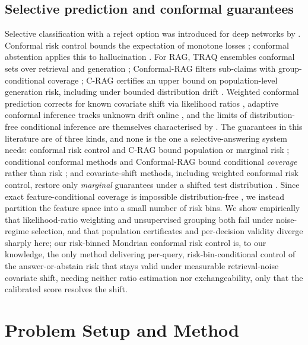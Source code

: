 \documentclass[sn-basic]{sn-jnl}
\theoremstyle{thmstyleone}
\theoremstyle{thmstyletwo}
\begin{document}
\subsection{Selective prediction and conformal guarantees}
Selective classification with a reject option was introduced for deep networks by \citet{geifman2017selective}. Conformal risk control bounds the
expectation of monotone losses \citep{angelopoulos2024crc}; conformal abstention applies this to hallucination \citep{abbasi2024conformalabstention}. For RAG, TRAQ ensembles
conformal sets over retrieval and generation \citep{li2024traq};
Conformal-RAG filters sub-claims with group-conditional coverage
\citep{feng2025conformalrag}; C-RAG certifies an upper bound on
population-level generation risk, including under bounded distribution
drift \citep{kang2024crag}. Weighted conformal prediction corrects for
known covariate shift via likelihood ratios
\citep{tibshirani2019covariate}, adaptive conformal inference tracks
unknown drift online \citep{gibbs2021aci}, and the limits of
distribution-free conditional inference are themselves characterised by
\citet{barber2021limits}.
The guarantees in this literature are of three kinds, and none is the one a
selective-answering system needs: conformal risk control and C-RAG bound
population or marginal risk \citep{angelopoulos2024crc,kang2024crag}; conditional
conformal methods and Conformal-RAG bound conditional \emph{coverage} rather than
risk \citep{gibbs2025conditional,feng2025conformalrag}; and covariate-shift
methods, including weighted conformal risk control, restore only \emph{marginal}
guarantees under a shifted test distribution
\citep{tibshirani2019covariate,gibbs2021aci,zecchin2025wcrc}. Since exact
feature-conditional coverage is impossible distribution-free
\citep{barber2021limits}, we instead partition the feature space into a small
number of risk bins. We show empirically that likelihood-ratio weighting and
unsupervised grouping both fail under noise-regime selection, and that population
certificates and per-decision validity diverge sharply here; our risk-binned
Mondrian conformal risk control is, to our knowledge, the only method delivering
per-query, risk-bin-conditional control of the answer-or-abstain risk that stays
valid under measurable retrieval-noise covariate shift, needing neither ratio
estimation nor exchangeability, only that the calibrated score resolves the shift.

\section{Problem Setup and Method}\label{sec:method}
\end{document}
